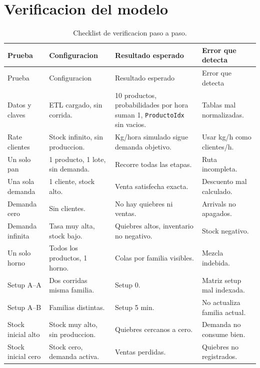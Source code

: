 \documentclass[11pt]{article}
\newcommand{\state}[1]{\texttt{#1}}
\begin{document}
\section{Verificacion del modelo}

\scriptsize
\begin{longtable}{L{3.3cm}L{3.6cm}L{4.0cm}L{4.0cm}}
\caption{Checklist de verificacion paso a paso.}\\
\toprule
{}
\color{white}Prueba & \color{white}Configuracion & \color{white}Resultado esperado & \color{white}Error que detecta \\
\midrule
\endfirsthead
\toprule
{}
\color{white}Prueba & \color{white}Configuracion & \color{white}Resultado esperado & \color{white}Error que detecta \\
\midrule
\endhead
Datos y claves & ETL cargado, sin corrida. & 10 productos, probabilidades por hora suman 1, \state{ProductoIdx} sin vacios. & Tablas mal normalizadas. \\
Rate clientes & Stock infinito, sin produccion. & Kg/hora simulado sigue demanda objetivo. & Usar kg/h como clientes/h. \\
Un solo pan & 1 producto, 1 lote, sin demanda. & Recorre todas las etapas. & Ruta incompleta. \\
Una sola demanda & 1 cliente, stock alto. & Venta satisfecha exacta. & Descuento mal calculado. \\
Demanda cero & Sin clientes. & No hay quiebres ni ventas. & Arrivals no apagados. \\
Demanda infinita & Tasa muy alta, stock bajo. & Quiebres altos, inventario no negativo. & Stock negativo. \\
Un solo horno & Todos los productos, 1 horno. & Colas por familia visibles. & Mezcla indebida. \\
Setup A--A & Dos corridas misma familia. & Setup 0. & Matriz setup mal indexada. \\
Setup A--B & Familias distintas. & Setup 5 min. & No actualiza familia actual. \\
Stock inicial alto & Stock muy alto, sin produccion. & Quiebres cercanos a cero. & Demanda no consume bien. \\
Stock inicial cero & Stock cero, demanda activa. & Ventas perdidas. & Quiebres no registrados. \\

\end{longtable}
\end{document}
